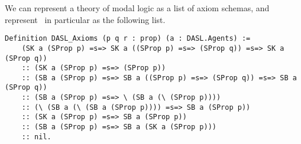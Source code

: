 
We can represent a theory of modal logic as a list of axiom schemas, and represent \DASL\ in particular as the following list.

\begin{tcolorbox}
		\begin{lstlisting}[language=Coq]
	Definition DASL_Axioms (p q r : prop) (a : DASL.Agents) := 
	(SK a (SProp p) =s=> SK a ((SProp p) =s=> (SProp q)) =s=> SK a (SProp q))
	:: (SK a (SProp p) =s=> (SProp p))
	:: (SB a (SProp p) =s=> SB a ((SProp p) =s=> (SProp q)) =s=> SB a (SProp q))
	:: (SB a (SProp p) =s=> \ (SB a (\ (SProp p))))
	:: (\ (SB a (\ (SB a (SProp p)))) =s=> SB a (SProp p))
	:: (SK a (SProp p) =s=> SB a (SProp p))
	:: (SB a (SProp p) =s=> SB a (SK a (SProp p)))
	:: nil.
	\end{lstlisting}
\end{tcolorbox}

